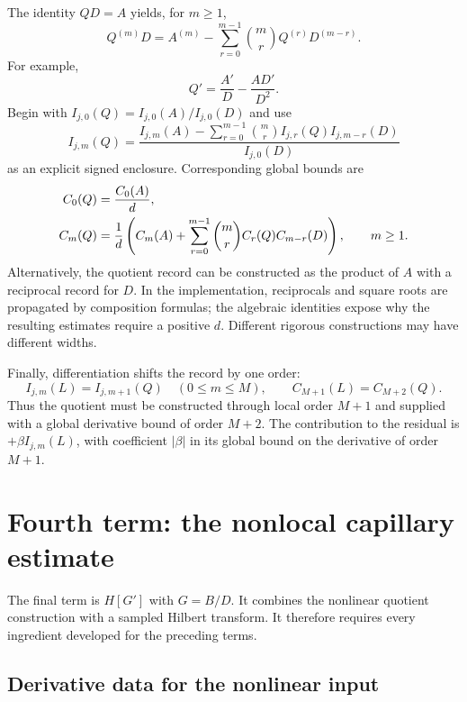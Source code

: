 \documentclass[11pt]{article}
\numberwithin{equation}{section}
\begin{document}
The identity $QD=A$ yields, for $m\geq1$,
\begin{equation}
 Q^{(m)}D=A^{(m)}-
 \sum_{r=0}^{m-1}\binom mr Q^{(r)}D^{(m-r)}.
 \label{eq:Q-recurrence}
\end{equation}
For example,
\begin{equation}
 Q'=\frac{A'}{D}-\frac{AD'}{D^2}.
\end{equation}
Begin with $I_{j,0}(Q)=I_{j,0}(A)/I_{j,0}(D)$ and use
\begin{equation}
 I_{j,m}(Q)=\frac{I_{j,m}(A)-
 \sum_{r=0}^{m-1}\binom mr I_{j,r}(Q)I_{j,m-r}(D)}{I_{j,0}(D)}
 \label{eq:Q-local}
\end{equation}
as an explicit signed enclosure. Corresponding global bounds are
\begin{align}
 C_0(Q)&=\frac{C_0(A)}{d},\notag\\
 C_m(Q)&=\frac{1}{d}\left(
 C_m(A)+\sum_{r=0}^{m-1}\binom mr C_r(Q)C_{m-r}(D)\right),
 \qquad m\geq1.
 \label{eq:Q-global}
\end{align}
Alternatively, the quotient record can be constructed as the product of
$A$ with a reciprocal record for $D$. In the implementation, reciprocals
and square roots are propagated by composition formulas; the algebraic
identities expose why the resulting estimates require a positive $d$.
Different rigorous constructions may have different widths.

Finally, differentiation shifts the record by one order:
\begin{equation}
 \boxed{I_{j,m}(L)=I_{j,m+1}(Q)\quad(0\leq m\leq M),
 \qquad C_{M+1}(L)=C_{M+2}(Q).}
 \label{eq:L-record}
\end{equation}
Thus the quotient must be constructed through local order $M+1$ and
supplied with a global derivative bound of order $M+2$. The contribution to the
residual is $+\beta I_{j,m}(L)$, with coefficient $|\beta|$ in its global
bound on the derivative of order $M+1$.

\section{Fourth term: the nonlocal capillary estimate}
\label{sec:nonlocal-capillary}

The final term is $H[G']$ with $G=B/D$. It combines the nonlinear
quotient construction with a sampled Hilbert transform. It therefore
requires every ingredient developed for the preceding terms.

\subsection{Derivative data for the nonlinear input}
\end{document}
